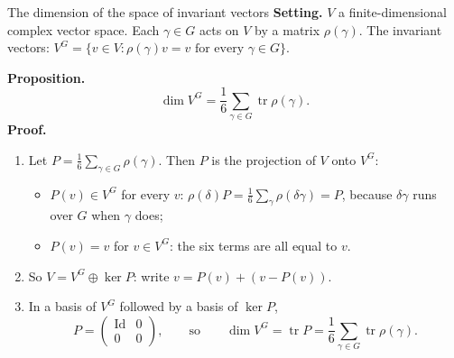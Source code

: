 \begin{frame}{The dimension of the space of invariant vectors}
\textbf{Setting.} \(V\) a finite-dimensional complex vector space. Each \(\gamma\in G\) acts on \(V\) by a matrix \(\rho(\gamma)\). The invariant vectors: \(V^G=\{v\in V:\rho(\gamma)v=v\text{ for every }\gamma\in G\}\).
\par
\textbf{Proposition.}
\[
\boxed{\dim V^G=\frac16\sum_{\gamma\in G}\operatorname{tr}\rho(\gamma).}
\]
\textbf{Proof.}
\begin{enumerate}
\setlength{\itemsep}{2pt}
\item Let \(P=\frac16\sum_{\gamma\in G}\rho(\gamma)\). Then \(P\) is the projection of \(V\) onto \(V^G\):
\begin{itemize}
\item \(P(v)\in V^G\) for every \(v\): \(\rho(\delta)P=\frac16\sum_\gamma\rho(\delta\gamma)=P\), because \(\delta\gamma\) runs over \(G\) when \(\gamma\) does;
\item \(P(v)=v\) for \(v\in V^G\): the six terms are all equal to \(v\).
\end{itemize}
\item So \(V=V^G\oplus\ker P\): write \(v=P(v)+(v-P(v))\).
\item In a basis of \(V^G\) followed by a basis of \(\ker P\),
\[
P=\begin{pmatrix}\mathrm{Id}&0\\0&0\end{pmatrix},\qquad\text{so}\qquad\dim V^G=\operatorname{tr}P=\frac16\sum_{\gamma\in G}\operatorname{tr}\rho(\gamma).
\]
\end{enumerate}
\end{frame}

